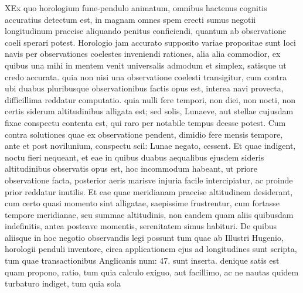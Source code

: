              \centering[66 r\textsuperscript{o}] X\pend \pstart Ex quo horologium\protect{} fune-pendulo\protect{} animatum, omnibus hactenus cognitis accuratius detectum est, in magnam omnes spem erecti sumus negotii longitudinum\protect{} praecise aliquando penitus conficiendi, quantum ab observatione coeli sperari potest. Horologio\protect{} jam accurato supposito variae propositae sunt loci navis\protect{} per observationes coelestes inveniendi rationes, alia alia commodior, ex quibus una mihi in mentem venit universalis admodum et simplex, satisque ut credo accurata.\pend \pstart {} quia non nisi una observatione coelesti transigitur, cum contra ubi duabus pluribusque observationibus  factis opus est, interea navi\protect{} provecta, difficillima reddatur computatio.  quia nulli fere tempori, non diei, non nocti, non certis siderum altitudinibus alligata est; sed solis\protect{}, Lunaeve\protect{}, aut stellae\protect{} cujusdam fixae conspectu contenta est, qui raro per notabile tempus deesse potest. Cum contra solutiones quae ex \protect{}observatione pendent, dimidio fere mensis tempore, ante et post novilunium, conspectu scil: Lunae\protect{} negato, cessent. Et quae \protect{} indigent, noctu fieri nequeant, et eae in quibus duabus aequalibus ejusdem sideris\protect{} altitudinibus observatis opus est, hoc incommodum habeant, ut priore observatione facta, posterior aeris marisve injuria facile intercipiatur, ac proinde prior reddatur inutilis. Et eae quae meridianam praecise altitudinem desiderant, cum certo quasi momento sint alligatae, saepissime frustrentur, cum fortasse tempore meridianae, seu summae altitudinis, non eandem quam aliis quibusdam indefinitis, antea posteave momentis, serenitatem simus habituri. De quibus aliisque in hoc negotio observandis legi possunt tum quae ab Illustri Hugenio\protect{}, horologii penduli\protect{} inventore, circa applicationem ejus ad longitudines\protect{} sunt scripta, tum quae transactionibus Anglicanis num: 47. sunt inserta.  denique satis est quam propono, ratio, tum quia calculo exiguo, aut facillimo, ac ne nautas quidem turbaturo indiget, tum quia sola 